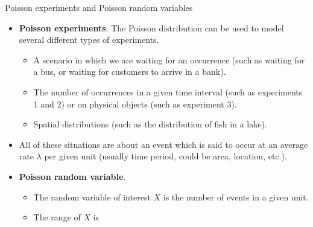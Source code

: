 \documentclass{article}
\begin{document}
Poisson experiments and Poisson random variables\bigskip
\begin{itemize}
    \item \textbf{Poisson experiments}: The Poisson distribution can be used to model several different types of experiments.\bigskip
    \begin{itemize}
        \item A scenario in which we are waiting for an occurrence (such as waiting for a bus, or waiting for customers to arrive in a bank).
        \item The number of occurrences in a given time interval (such as experiments 1 and 2) or on physical objects (such as experiment 3).
        \item Spatial distributions (such as the distribution of fish in a lake). 
    \end{itemize}\bigskip
    \item[] All of these situations are about an event which is said to occur at an average rate $\lambda$ per given unit (usually time period, could be area, location, etc.).\bigskip
    \item \textbf{Poisson random variable}.
    \begin{itemize}
        \item The random variable of interest $X$ is the number of events in a given unit.
        \item The range of $X$ is 
    \end{itemize}
\end{itemize}

\newpage%
\end{document}
